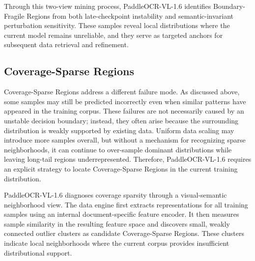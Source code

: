 \documentclass[11pt, a4paper,logo,  copyright, nonumbering]{paddleocr}
\begin{document}
Through this two-view mining process, PaddleOCR-VL-1.6 identifies Boundary-Fragile Regions from both late-checkpoint instability and semantic-invariant perturbation sensitivity. These samples reveal local distributions where the current model remains unreliable, and they serve as targeted anchors for subsequent data retrieval and refinement.


\subsection{Coverage-Sparse Regions}

Coverage-Sparse Regions address a different failure mode. As discussed above, some samples may still be predicted incorrectly even when similar patterns have appeared in the training corpus. These failures are not necessarily caused by an unstable decision boundary; instead, they often arise because the surrounding distribution is weakly supported by existing data. Uniform data scaling may introduce more samples overall, but without a mechanism for recognizing sparse neighborhoods, it can continue to over-sample dominant distributions while leaving long-tail regions underrepresented. Therefore, PaddleOCR-VL-1.6 requires an explicit strategy to locate Coverage-Sparse Regions in the current training distribution.

PaddleOCR-VL-1.6 diagnoses coverage sparsity through a visual-semantic neighborhood view. The data engine first extracts representations for all training samples using an internal document-specific feature encoder. It then measures sample similarity in the resulting feature space and discovers small, weakly connected outlier clusters as candidate Coverage-Sparse Regions. These clusters indicate local neighborhoods where the current corpus provides insufficient distributional support.
\end{document}
